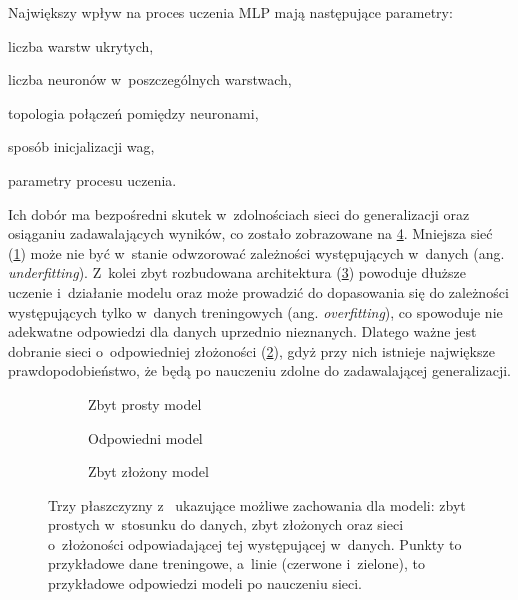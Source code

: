 Największy wpływ na proces uczenia \gls{MLP}
mają następujące parametry:
\begin{nospitemize}
  \item liczba warstw ukrytych,
  \item liczba neuronów w~poszczególnych warstwach,
  \item topologia połączeń pomiędzy neuronami,
  \item sposób inicjalizacji wag,
  \item parametry procesu uczenia.
\end{nospitemize}

Ich dobór ma bezpośredni skutek
w~zdolnościach sieci do generalizacji
oraz osiąganiu zadawalających wyników,
co zostało zobrazowane na
\cref{fig:fitting_under_over}.
Mniejsza sieć (\cref{subfig:underfitting})
może nie być w~stanie odwzorować zależności
występujących w~danych (ang. \textit{underfitting}).
Z~kolei zbyt rozbudowana architektura
(\cref{subfig:overfitting}) powoduje dłuższe uczenie
i~działanie modelu oraz może prowadzić
do dopasowania się do zależności występujących
tylko w~danych treningowych (ang. \textit{overfitting}),
co spowoduje nie adekwatne odpowiedzi
dla danych uprzednio nieznanych.
Dlatego ważne jest dobranie sieci
o~odpowiedniej złożoności
(\cref{subfig:appropriate_capacity}),
gdyż przy nich istnieje
największe prawdopodobieństwo,
że będą po nauczeniu zdolne
do zadawalającej generalizacji.

\begin{figure}
  \centering
  \begin{subfigure}{0.3\textwidth}
    \centering
    
    \caption{Zbyt prosty model}
    \label{subfig:underfitting}
  \end{subfigure}
  \hfill
  \begin{subfigure}{0.3\textwidth}
    \centering
    
    \caption{Odpowiedni model}
    \label{subfig:appropriate_capacity}
  \end{subfigure}
  \hfill
  \begin{subfigure}{0.3\textwidth}
    \centering
    
    \caption{Zbyt złożony model}
    \label{subfig:overfitting}
  \end{subfigure}

  \caption{
    Trzy płaszczyzny
    z~
    ukazujące możliwe zachowania dla modeli:
    \textbf{}
    zbyt prostych w~stosunku do danych,
    \textbf{}
    zbyt złożonych oraz
    \textbf{}
    sieci o~złożoności odpowiadającej
    tej występującej w~danych.
    Punkty to przykładowe dane treningowe,
    a~linie (czerwone i~zielone),
    to przykładowe odpowiedzi modeli
    po nauczeniu sieci.
  }
  \label{fig:fitting_under_over}
\end{figure}

